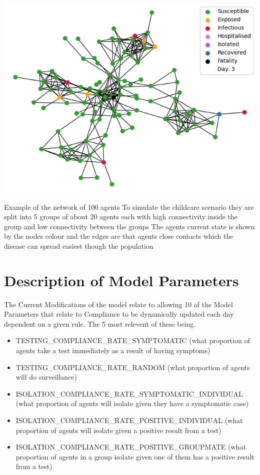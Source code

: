 \documentclass{article}
\begin{document}
\includegraphics[width=\textwidth]{network}

Example of the network of 100 agents
To simulate the childcare scenario they are split into 5 groups of about 20 agents each with high connectivity inside the group and low connectivity between the groups 
The agents current state is shown by the nodes colour and the edges are that agents close contacts which the disease can spread easiest though the population


\section{Description of Model Parameters}
The Current Modifications of the model relate to allowing 10 of the Model Parameters that relate to Compliance to be dynamically updated each day dependent on a given rule. The 5 most relevent of these being.
\begin{itemize}
\item TESTING\_COMPLIANCE\_RATE\_SYMPTOMATIC (what proportion of agents take a test immediately as a result of having symptoms)
\item TESTING\_COMPLIANCE\_RATE\_RANDOM  (what proportion of agents will do surveillance)
\item ISOLATION\_COMPLIANCE\_RATE\_SYMPTOMATIC\_INDIVIDUAL (what proportion of agents will isolate given they have a symptomatic case)
\item ISOLATION\_COMPLIANCE\_RATE\_POSITIVE\_INDIVIDUAL (what proportion of agents will isolate given a positive result from a test)
\item ISOLATION\_COMPLIANCE\_RATE\_POSITIVE\_GROUPMATE (what proportion of agents in a group isolate given one of them has a positive result from a test)
\end{itemize}
\end{document}

